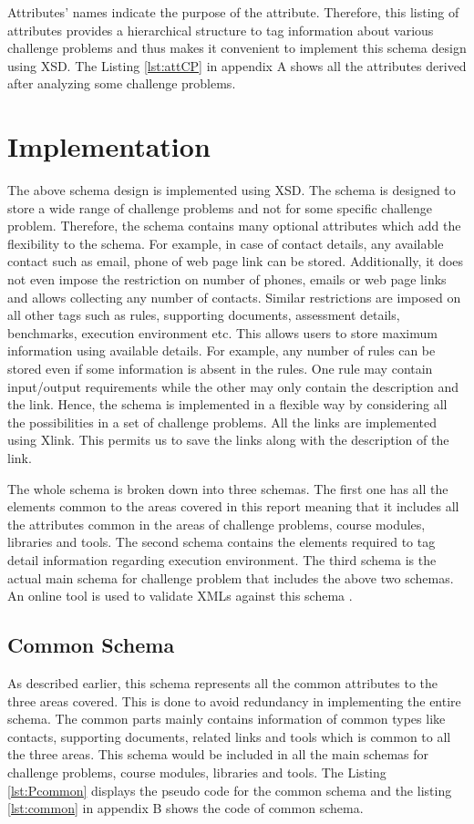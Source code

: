 \documentclass[11pt,letterpaper]{report}
\begin{document}
Attributes' names indicate the purpose of the attribute. Therefore, this listing of attributes provides a hierarchical structure to tag information about various challenge problems and thus makes it convenient to implement this schema design using XSD. The Listing \ref{lst:attCP} in appendix A shows all the attributes derived after analyzing some challenge problems.

\section{Implementation}
The above schema design is implemented using XSD. The schema is designed to store a wide range of challenge problems and not for some specific challenge problem. Therefore, the schema contains many optional attributes which add the flexibility to the schema. For example, in case of contact details, any available contact such as email, phone of web page link can be stored. Additionally, it does not even impose the restriction on number of phones, emails or web page links and allows collecting any number of contacts. Similar restrictions are imposed on all other tags such as rules, supporting documents, assessment details, benchmarks, execution environment etc. This allows users to store maximum information using available details. For example, any number of rules can be stored even if some information is absent in the rules. One rule may contain input/output requirements while the other may only contain the description and the link. Hence, the schema is implemented in a flexible way by considering all the possibilities in a set of challenge problems. All the links are implemented using Xlink. This permits us to save the links along with the description of the link.    

The whole schema is broken down into three schemas. The first one has all the elements common to the areas covered in this report meaning that it includes all the attributes common in the areas of challenge problems, course modules, libraries and tools. The second schema contains the elements required to tag detail information regarding execution environment. The third schema is the actual main schema for challenge problem that includes the above two schemas. An online tool is used to validate XMLs against this schema \cite{olXSD}.

\subsection{Common Schema}
As described earlier, this schema represents all the common attributes to the three areas covered. This is done to avoid redundancy in implementing the entire schema. The common parts mainly contains information of common types like contacts, supporting documents, related links and tools which is common to all the three areas. This schema would be included in all the main schemas for challenge problems, course modules, libraries and tools. The Listing \ref{lst:Pcommon} displays the pseudo code for the common schema and the listing \ref{lst:common} in appendix B shows the code of common schema.     
\end{document}
